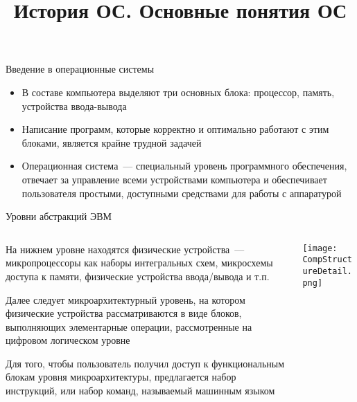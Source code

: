 \documentclass[aspectratio=169,14pt]{beamer}
\title{История ОС. Основные понятия ОС}
\begin{document}
\begin{frame}{Введение в операционные системы}
    \begin{itemize}
        \item В составе компьютера выделяют три основных блока: процессор,
        память, устройства ввода-вывода
        \item Написание программ, которые корректно и оптимально работают
        с этим блоками, является крайне трудной задачей
        \item Операционная система~--- специальный уровень программного
        обеспечения, отвечает за управление всеми устройствами
        компьютера и обеспечивает пользователя простыми, доступными
        средствами для работы с аппаратурой
    \end{itemize}
\end{frame}

\begin{frame}{Уровни абстракций ЭВМ}
    \begin{columns}
        \begin{column}{0.65\textwidth}
            \begin{itemize}
                \begin{footnotesize}
                \begin{spacing}{1}
                    \item На нижнем уровне находятся физические устройства~---
                    микропроцессоры как наборы интегральных схем, микросхемы
                    доступа к памяти, физические устройства ввода/вывода и т.п.
                    \item Далее следует микроархитектурный уровень, на котором
                    физические устройства рассматриваются в виде блоков,
                    выполняющих элементарные операции, рассмотренные на
                    цифровом логическом уровне
                    \item Для того, чтобы пользователь получил доступ к
                    функциональным блокам уровня микроархитектуры,
                    предлагается набор инструкций, или набор команд,
                    называемый машинным языком
                \end{spacing}
                \end{footnotesize}
            \end{itemize}
        \end{column}
        \begin{column}{0.35\textwidth}
            \texttt{[image: CompStructureDetail.png]}
        \end{column}
    \end{columns}
\end{frame}
\end{document}
